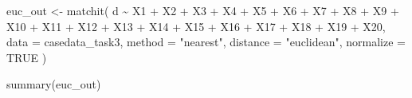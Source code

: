\documentclass[
  letterpaper,
  DIV=11,
  numbers=noendperiod]{scrartcl}
\newenvironment{Shaded}{\begin{snugshade}}{\end{snugshade}}
\newcommand{\AttributeTok}[1]{\textcolor[rgb]{0.40,0.45,0.13}{#1}}
\newcommand{\ConstantTok}[1]{\textcolor[rgb]{0.56,0.35,0.01}{#1}}
\newcommand{\FunctionTok}[1]{\textcolor[rgb]{0.28,0.35,0.67}{#1}}
\newcommand{\NormalTok}[1]{\textcolor[rgb]{0.00,0.23,0.31}{#1}}
\newcommand{\OtherTok}[1]{\textcolor[rgb]{0.00,0.23,0.31}{#1}}
\newcommand{\SpecialCharTok}[1]{\textcolor[rgb]{0.37,0.37,0.37}{#1}}
\newcommand{\StringTok}[1]{\textcolor[rgb]{0.13,0.47,0.30}{#1}}
\begin{document}
\begin{Shaded}
\begin{Highlighting}[]
\NormalTok{euc\_out }\OtherTok{\textless{}{-}} \FunctionTok{matchit}\NormalTok{(}
\NormalTok{  d }\SpecialCharTok{\textasciitilde{}}\NormalTok{ X1 }\SpecialCharTok{+}\NormalTok{ X2 }\SpecialCharTok{+}\NormalTok{ X3 }\SpecialCharTok{+}\NormalTok{ X4 }\SpecialCharTok{+}\NormalTok{ X5 }\SpecialCharTok{+}\NormalTok{ X6 }\SpecialCharTok{+}\NormalTok{ X7 }\SpecialCharTok{+}\NormalTok{ X8 }\SpecialCharTok{+}\NormalTok{ X9 }\SpecialCharTok{+}\NormalTok{ X10 }\SpecialCharTok{+}
\NormalTok{       X11 }\SpecialCharTok{+}\NormalTok{ X12 }\SpecialCharTok{+}\NormalTok{ X13 }\SpecialCharTok{+}\NormalTok{ X14 }\SpecialCharTok{+}\NormalTok{ X15 }\SpecialCharTok{+}\NormalTok{ X16 }\SpecialCharTok{+}\NormalTok{ X17 }\SpecialCharTok{+}\NormalTok{ X18 }\SpecialCharTok{+}\NormalTok{ X19 }\SpecialCharTok{+}\NormalTok{ X20,}
  \AttributeTok{data =}\NormalTok{ casedata\_task3,}
  \AttributeTok{method =} \StringTok{"nearest"}\NormalTok{,}
  \AttributeTok{distance =} \StringTok{"euclidean"}\NormalTok{,}
  \AttributeTok{normalize =} \ConstantTok{TRUE}
\NormalTok{)}

\FunctionTok{summary}\NormalTok{(euc\_out)}
\end{Highlighting}
\end{Shaded}
\end{document}
